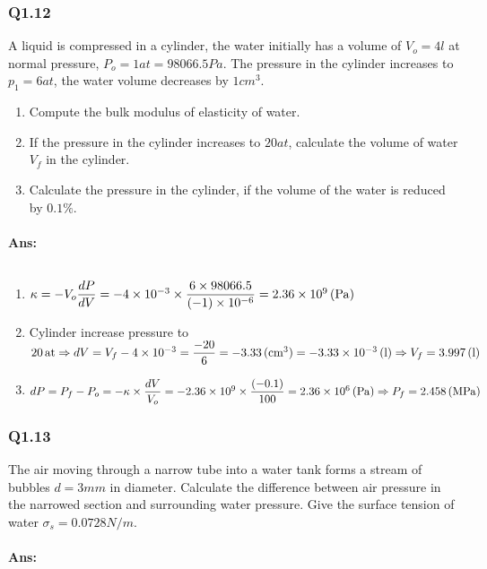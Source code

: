 \subsubsection{Q1.12}
A liquid is compressed in a cylinder, the water initially has a volume of $ V_o=4\unit{l} $ at normal pressure, $ P_o=1\unit{at}=98066.5\unit{Pa} $. The pressure in the cylinder increases to $ p_1=6\unit{at} $, the water volume decreases by $ 1\unit{cm^3} $.
\begin{enumerate}
	\item Compute the bulk modulus of elasticity of water.
	\item If the pressure in the cylinder increases to $ 20\unit{at} $, calculate the volume of water $ V_f $ in the cylinder.
	\item Calculate the pressure in the cylinder, if the volume of the water is reduced by $ 0.1\% $.
\end{enumerate}
\paragraph{Ans:}$ $
\begin{enumerate}
	\item $ \kappa = -V_o\dfrac{dP}{dV} = -4\times10^{-3}\times\dfrac{6\times98066.5}{(-1)\times10^{-6}}= 2.36\times10^9\, (\mathrm{Pa})$
	\item Cylinder increase pressure to $ 20\, \mathrm{at}\\ \Rightarrow dV = V_f - 4\times10^{-3}=\dfrac{-20}{6}=-3.33\, (\mathrm{cm^3})=-3.33\times10^{-3}\, (\mathrm{l})\\
	\Rightarrow V_f = 3.997\, (\mathrm{l})$
	\item $ dP =P_f-P_o= -\kappa\times\dfrac{dV}{V_o} = -2.36\times10^9\times\dfrac{(-0.1)}{100}=2.36\times10^6\, (\mathrm{Pa})\\
	\Rightarrow P_f = 2.458\, (\mathrm{MPa})$
\end{enumerate}
\subsubsection{Q1.13}
The air moving through a narrow tube into a water tank forms a stream of bubbles $ d=3\unit{mm} $ in diameter. Calculate the difference between air pressure in the narrowed section and surrounding water pressure. Give the surface tension of water $ \sigma_s = 0.0728\unit{N/m} $.
\paragraph{Ans:}$ $
